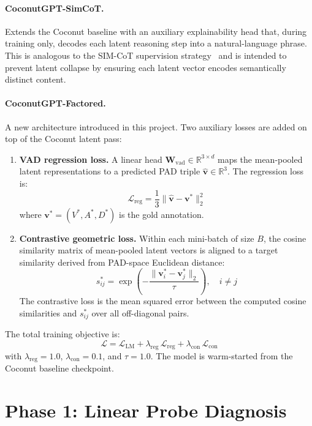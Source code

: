 \documentclass[12pt,twoside]{report}
\begin{document}
\paragraph{CoconutGPT-SimCoT.}
Extends the Coconut baseline with an auxiliary explainability head that, during training only, decodes each latent reasoning step into a natural-language phrase.
This is analogous to the SIM-CoT supervision strategy~\cite{wei2025simcot} and is intended to prevent latent collapse by ensuring each latent vector encodes semantically distinct content.

\paragraph{CoconutGPT-Factored.}
A new architecture introduced in this project.
Two auxiliary losses are added on top of the Coconut latent pass:
\begin{enumerate}
    \item \textbf{VAD regression loss.} A linear head $\mathbf{W}_{\text{vad}} \in \mathbb{R}^{3 \times d}$ maps the mean-pooled latent representations to a predicted PAD triple $\hat{\mathbf{v}} \in \mathbb{R}^3$.
    The regression loss is:
    \[
        \mathcal{L}_{\text{reg}} = \frac{1}{3} \|\hat{\mathbf{v}} - \mathbf{v}^*\|_2^2
    \]
    where $\mathbf{v}^* = (V^*, A^*, D^*)$ is the gold annotation.

    \item \textbf{Contrastive geometric loss.} Within each mini-batch of size $B$, the cosine similarity matrix of mean-pooled latent vectors is aligned to a target similarity derived from PAD-space Euclidean distance:
    \[
        s_{ij}^* = \exp\!\left(-\frac{\|\mathbf{v}_i^* - \mathbf{v}_j^*\|_2}{\tau}\right), \quad i \neq j
    \]
    The contrastive loss is the mean squared error between the computed cosine similarities and $s_{ij}^*$ over all off-diagonal pairs.
\end{enumerate}

The total training objective is:
\[
    \mathcal{L} = \mathcal{L}_{\text{LM}} + \lambda_{\text{reg}}\,\mathcal{L}_{\text{reg}} + \lambda_{\text{con}}\,\mathcal{L}_{\text{con}}
\]
with $\lambda_{\text{reg}} = 1.0$, $\lambda_{\text{con}} = 0.1$, and $\tau = 1.0$.
The model is warm-started from the Coconut baseline checkpoint.

\section{Phase 1: Linear Probe Diagnosis}
\end{document}
